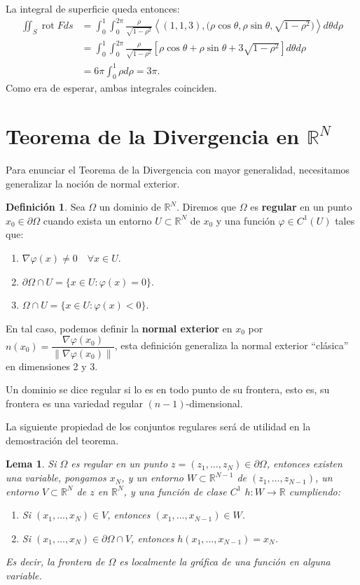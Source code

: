 \documentclass[12pt,spanish]{article}
\newtheorem{lemma}[theorem]{Lema}
\theoremstyle{definition}
\newtheorem{definition}[theorem]{Definici\'on}
\theoremstyle{remark}
\begin{document}
La integral de superficie queda entonces:
\begin{align*}
\iint_{S}\operatorname{rot} F ds&=\int_0^1\int_0^{2\pi}\frac{\rho}{\sqrt{1-\rho^2}}\left\langle(1,1,3),\big(\rho\cos \theta, \rho\sin\theta, \sqrt{1-\rho^2}\big)\right\rangle d\theta d\rho \\ 
&=\int_0^1\int_0^{2\pi}\frac{\rho}{\sqrt{1-\rho^2}}\left[\rho\cos\theta+\rho\sin\theta+3\sqrt{1-\rho^2} \right] d\theta d\rho \\
&= 6\pi\int_0^1 \rho d\rho=3\pi.
\end{align*}
Como era de esperar, ambas integrales coinciden.

\section{Teorema de la Divergencia en $\mathbb{R}^N$}

Para enunciar el Teorema de la Divergencia con mayor generalidad, necesitamos generalizar la noción de normal exterior. 

\begin{definition}
	Sea $\Omega$ un dominio de $\mathbb{R}^N$. Diremos que $\Omega$ es \textbf{regular} en un punto $x_0\in\partial\Omega$ cuando exista un entorno $U\subset\mathbb{R}^N$ de $x_0$ y una función $\varphi\in C^1(U)$ tales que:
	\begin{enumerate}[$(a)$]
		\item $\nabla \varphi(x)\neq 0\quad\forall x\in U$.
		\item $\partial\Omega\cap U=\{x\in U:\varphi(x)=0\}$.
		\item $\Omega\cap U=\{x\in U:\varphi(x)<0\}$.
	\end{enumerate}
En tal caso, podemos definir la \textbf{normal exterior} en $x_0$ por $n(x_0)=\dfrac{\nabla \varphi(x_0)}{\|\nabla \varphi(x_0)\|}$, esta definición generaliza la normal exterior ``clásica'' en dimensiones 2 y 3.

Un dominio se dice regular si lo es en todo punto de su frontera, esto es, su frontera es una variedad regular $(n-1)$-dimensional.
\end{definition}

La siguiente propiedad de los conjuntos regulares será de utilidad en la demostración del teorema.

\begin{lemma} \label{lm:regular-despejar}
	Si $\Omega$ es regular en un punto $z=(z_1,\ldots,z_N)\in\partial\Omega$, entonces existen una variable, pongamos $x_N$, y un entorno $W\subset\mathbb{R}^{N-1}$ de $(z_1,\ldots,z_{N-1})$, un entorno $V\subset\mathbb{R}^N$ de $z$ en $\mathbb{R}^N$, y una función de clase $C^1$ $h:W\rightarrow \mathbb{R}$ cumpliendo:
	\begin{enumerate}[$(a)$]
		\item Si $(x_1,\ldots,x_N)\in V$, entonces $(x_1,\ldots,x_{N-1})\in W$.
		\item Si $(x_1,\ldots,x_N)\in \partial\Omega\cap V$, entonces $h(x_1,\ldots,x_{N-1})=x_N$.
	\end{enumerate}
Es decir, la frontera de $\Omega$ es localmente la gráfica de una función en alguna variable.
\end{lemma}
\end{document}
